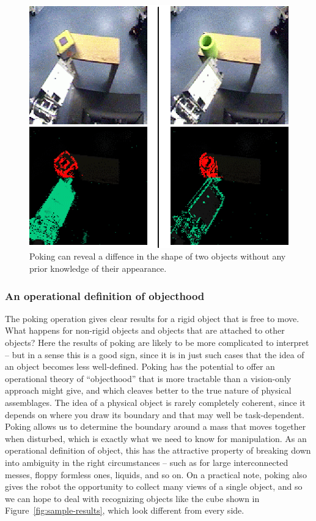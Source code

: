 \ifverbose
\begin{figure}[tbh]
\begin{center}
\includegraphics[width=\columnwidth]{cube-and-cylinder.eps}
\caption{ 
\label{fig:cube-and-cylinder}
%
  Poking can reveal a diffence in the shape of two objects without
  any prior knowledge of their appearance.
%
}
\end{center}
\end{figure}
\fi




\subsubsection*{An operational definition of objecthood}

The poking operation gives clear results for a rigid object that is
free to move.  What happens for non-rigid objects and objects that are
attached to other objects?  Here the results of poking are likely to
be more complicated to interpret -- but in a sense this is a good
sign, since it is in just such cases that the idea of an object
becomes less well-defined.  Poking has the potential to offer an
operational theory of ``objecthood'' that is more tractable than a
vision-only approach might give, and which cleaves better to the true
nature of physical assemblages.  The idea of a physical object is
rarely completely coherent, since it depends on where you draw its
boundary and that may well be task-dependent.  Poking allows us to
determine the boundary around a mass that moves together when
disturbed, which is exactly what we need to know for manipulation.  As
an operational definition of object, this has the attractive property
of breaking down into ambiguity in the right circumstances -- such as
for large interconnected messes, floppy formless ones, liquids, and so
on.  On a practical note, poking also gives the robot the opportunity
to collect many views of a single object, and so we can hope to deal
with recognizing objects like the cube shown in
Figure~\ref{fig:sample-results}, which look different from every side.


